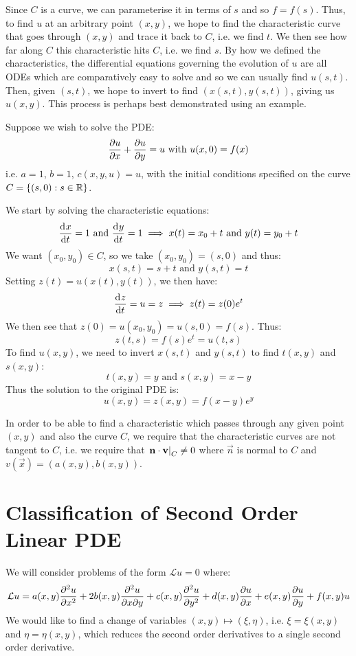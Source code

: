 \documentclass[../main.tex]{subfiles}
\begin{document}
Since $C$ is a curve, we can parameterise it in terms of $s$ and so $f = f(s)$.
Thus, to find $u$ at an arbitrary point $(x, y)$, we hope to find the characteristic curve that goes through $(x, y)$ and trace it back to $C$, i.e. we find $t$.
We then see how far along $C$ this characteristic hits $C$, i.e. we find $s$.
By how we defined the characteristics, the differential equations governing the evolution of $u$ are all ODEs which are comparatively easy to solve and so we can usually find $u(s, t)$.
Then, given $(s, t)$, we hope to invert to find $(x(s, t), y(s, t))$, giving us $u(x, y)$.
This process is perhaps best demonstrated using an example.
\begin{example}
  Suppose we wish to solve the PDE:
  \[
    \pderiv{u}{x} + \pderiv{u}{y} = u \text{ with } u(x, 0) = f(x)
  \]
  i.e. $a = 1$, $b = 1$, $c(x, y, u) = u$, with the initial conditions specified on the curve $C = \{(s, 0): s \in \mathbb{R}\}$.

  We start by solving the characteristic equations:
  \[
    \deriv{x}{t} = 1 \text{ and } \deriv{y}{t} = 1 \implies x(t) = x_0 + t \text{ and } y(t) = y_0 + t
  \]
  We want $(x_0, y_0) \in C$, so we take $(x_0, y_0) = (s, 0)$ and thus:
  \[
    x(s, t) = s + t \text{ and } y(s, t) = t
  \]
  Setting $z(t) = u(x(t), y(t))$, we then have:
  \[
    \deriv{z}{t} = u = z \implies z(t) = z(0) e^t
  \]
  We then see that $z(0) = u(x_0, y_0) = u(s, 0) = f(s)$.
  Thus:
  \[
    z(t, s) = f(s) e^{t} = u(t, s)
  \]
  To find $u(x, y)$, we need to invert $x(s, t)$ and $y(s, t)$ to find $t(x, y)$ and $s(x, y)$:
  \[
    t(x, y) = y \text{ and } s(x, y) = x - y
  \]
  Thus the solution to the original PDE is:
  \[
    u(x, y) = z(x, y) = f(x - y) e^{y}
  \]
\end{example}
\begin{remark}[Warning]
  In order to be able to find a characteristic which passes through any given point $(x, y)$ and also the curve $C$, we require that the characteristic curves are not tangent to $C$, i.e. we require that $\left. \mathbf{\bm{n}} \cdot \mathbf{\bm{v}} \right|_{C} \neq 0$ where $\vec{n}$ is normal to $C$ and $v(\vec{x}) = (a(x, y), b(x, y))$.
\end{remark}
\section{Classification of Second Order Linear PDE}
We will consider problems of the form $\mathcal{L}u = 0$ where:
\[
  \mathcal{L}u = a(x, y) \pderiv[2]{u}{x} + 2b(x, y) \frac{\partial^2 u}{\partial x \partial y} + c(x, y) \pderiv[2]{u}{y} + d(x, y) \pderiv{u}{x} + e(x, y) \pderiv{u}{y} + f(x, y)u
\]
We would like to find a change of variables $(x, y) \mapsto (\xi, \eta)$, i.e. $\xi = \xi(x,y)$ and $\eta = \eta(x, y)$, which reduces the second order derivatives to a single second order derivative.
\end{document}
